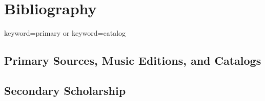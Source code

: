 \chapter{Bibliography}
\label{ch:biblio}




  {keyword=primary or keyword=catalog}

\section*{Primary Sources, Music Editions, and Catalogs}
\printbibliography[heading=none, filter=primary]

\section*{Secondary Scholarship}
\printbibliography[heading=none, filter=secondary]

\endinput



